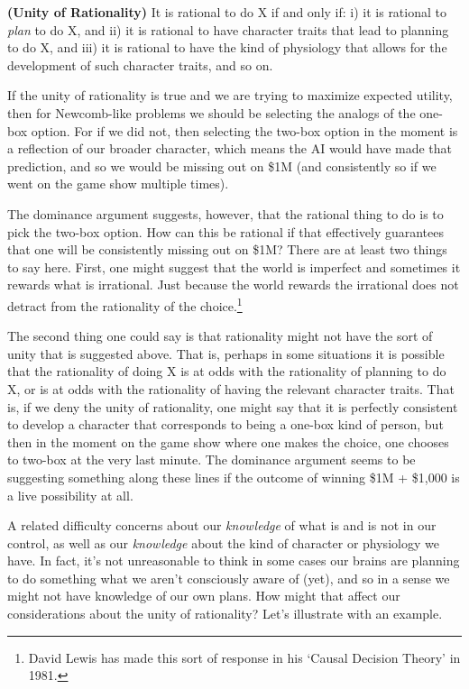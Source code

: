 \documentclass[]{tufte-book}
\begin{document}
\textbf{(Unity of Rationality)} It is rational to do X if and only if: i) it is rational to \emph{plan} to do X, and ii) it is rational to have character traits that lead to planning to do X, and iii) it is rational to have the kind of physiology that allows for the development of such character traits, and so on.

If the unity of rationality is true and we are trying to maximize expected utility, then for Newcomb-like problems we should be selecting the analogs of the one-box option. For if we did not, then selecting the two-box option in the moment is a reflection of our broader character, which means the AI would have made that prediction, and so we would be missing out on \$1M (and consistently so if we went on the game show multiple times).

The dominance argument suggests, however, that the rational thing to do is to pick the two-box option. How can this be rational if that effectively guarantees that one will be consistently missing out on \$1M? There are at least two things to say here. First, one might suggest that the world is imperfect and sometimes it rewards what is irrational. Just because the world rewards the irrational does not detract from the rationality of the choice.\footnote{David Lewis has made this sort of response in his `Causal Decision Theory' in 1981.}

The second thing one could say is that rationality might not have the sort of unity that is suggested above. That is, perhaps in some situations it is possible that the rationality of doing X is at odds with the rationality of planning to do X, or is at odds with the rationality of having the relevant character traits. That is, if we deny the unity of rationality, one might say that it is perfectly consistent to develop a character that corresponds to being a one-box kind of person, but then in the moment on the game show where one makes the choice, one chooses to two-box at the very last minute. The dominance argument seems to be suggesting something along these lines if the outcome of winning \$1M + \$1,000 is a live possibility at all.

A related difficulty concerns about our \emph{knowledge} of what is and is not in our control, as well as our \emph{knowledge} about the kind of character or physiology we have. In fact, it's not unreasonable to think in some cases our brains are planning to do something what we aren't consciously aware of (yet), and so in a sense we might not have knowledge of our own plans. How might that affect our considerations about the unity of rationality? Let's illustrate with an example.
\end{document}
